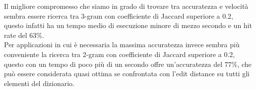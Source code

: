 \documentclass[]{article}
\begin{document}
Il migliore compromesso che siamo in grado di trovare tra accuratezza e velocità sembra essere ricerca tra 3-gram con coefficiente di Jaccard superiore a 0.2, questo infatti ha un tempo medio di esecuzione minore di mezzo secondo e un hit rate del 63\%.\\
Per applicazioni in cui è necessaria la massima accuratezza invece sembra più conveniente la ricerca tra 2-gram con coefficiente di Jaccard superiore a 0.2, questo con un tempo di poco più di un secondo offre un'accuratezza del 77\%, che può essere considerata quasi ottima se confrontata con l'edit distance su tutti gli elementi del dizionario.\\ 
\end{document}
